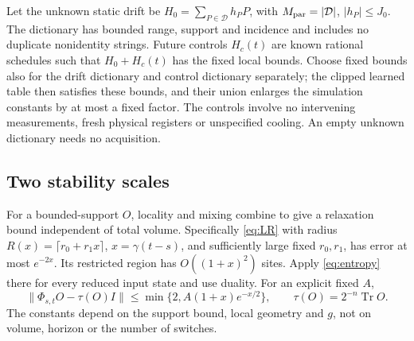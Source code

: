 \documentclass[11pt,reqno]{amsart}
\numberwithin{equation}{section}
\theoremstyle{definition}
\theoremstyle{remark}
\newcommand{\Tr}{\operatorname{Tr}}
\newcommand{\nn}[1]{\lVert#1\rVert}
\begin{document}
Let the unknown static drift be
$H_0=\sum_{P\in\mathcal D}h_PP$, with $M_{\rm par}=|\mathcal D|$, $|h_P|\leq J_0$. The dictionary has bounded range, support and incidence and includes no duplicate nonidentity strings. Future controls $H_c(t)$ are known rational schedules such that $H_0+H_c(t)$ has the fixed local bounds. Choose fixed bounds also for the drift dictionary and control dictionary separately; the clipped learned table then satisfies these bounds, and their union enlarges the simulation constants by at most a fixed factor. The controls involve no intervening measurements, fresh physical registers or unspecified cooling. An empty unknown dictionary needs no acquisition.

\subsection{Two stability scales}
For a bounded-support $O$, locality and mixing combine to give a relaxation bound independent of total volume. Specifically \eqref{eq:LR} with radius $R(x)=\lceil r_0+r_1x\rceil$, $x=\gamma(t-s)$, and sufficiently large fixed $r_0,r_1$, has error at most $e^{-2x}$. Its restricted region has $O((1+x)^2)$ sites. Apply \eqref{eq:entropy} there for every reduced input state and use duality. For an explicit fixed $A$,
\begin{equation}\label{eq:localrelax}
 \nn{\Phi_{s,t}O-\tau(O)I}
 \leq\min\{2,A(1+x)e^{-x/2}\},\qquad
 \tau(O)=2^{-n}\Tr O.
\end{equation}
The constants depend on the support bound, local geometry and $g$, not on volume, horizon or the number of switches.
\end{document}
